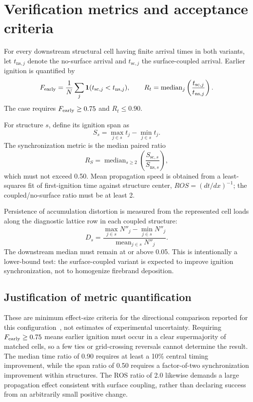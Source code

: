 \section{Verification metrics and acceptance criteria}

For every downstream structural cell having finite arrival times in both
variants, let \(t_{\mathrm{ns},j}\) denote the no-surface arrival and
\(t_{\mathrm{sc},j}\) the surface-coupled arrival. Earlier ignition is
quantified by
\[
  F_{\rm early}=\frac{1}{N}\sum_j
  \mathbf{1}(t_{\mathrm{sc},j}<t_{\mathrm{ns},j}),
  \qquad
  R_t=\operatorname{median}_j\left(
  \frac{t_{\mathrm{sc},j}}{t_{\mathrm{ns},j}}\right).
\]
The case requires \(F_{\rm early}\ge0.75\) and \(R_t\le0.90\).

For structure \(s\), define its ignition span as
\[
  S_s=\max_{j\in s}t_j-\min_{j\in s}t_j.
\]
The synchronization metric is the median paired ratio
\[
  R_S=\operatorname{median}_{s\ge2}
      \left(\frac{S_{\mathrm{sc},s}}{S_{\mathrm{ns},s}}\right),
\]
which must not exceed 0.50. Mean propagation speed is obtained from a
least-squares fit of first-ignition time against structure center,
\(ROS=(dt/dx)^{-1}\); the coupled/no-surface ratio must be at least 2.

Persistence of accumulation distortion is measured from the represented cell
loads along the diagnostic lattice row in each coupled structure:
\[
  D_s=\frac{\max_{j\in s}N''_j-\min_{j\in s}N''_j}
            {\operatorname{mean}_{j\in s}N''_j}.
\]
The downstream median must remain at or above 0.05. This is intentionally a
lower-bound test: the surface-coupled variant is expected to improve ignition
synchronization,
not to homogenize firebrand deposition.


\subsection{Justification of metric quantification}

These are minimum effect-size criteria for the directional comparison reported
for this configuration~\cite{Qin2025}, not estimates of experimental
uncertainty.  Requiring \(F_{\rm early}\ge0.75\) means earlier ignition must
occur in a clear supermajority of matched cells, so a few ties or grid-crossing
reversals cannot determine the result.  The median time ratio of 0.90 requires
at least a 10\% central timing improvement, while the span ratio of 0.50
requires a factor-of-two synchronization improvement within structures.  The
ROS ratio of 2.0 likewise demands a large propagation effect consistent with
surface coupling, rather than declaring success from an arbitrarily small
positive change.

